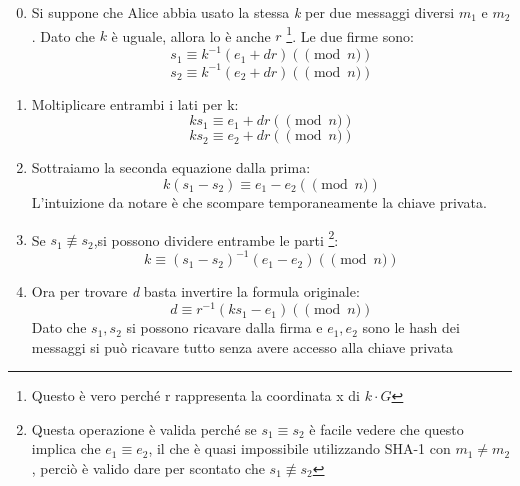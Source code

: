 \documentclass[12pt, a4paper]{report}
\begin{document}
\begin{enumerate}
    \setcounter{enumi}{-1}
    \item Si suppone che Alice abbia usato la stessa \textit{k} per due messaggi diversi $m_1$ e $m_2$. Dato che $k$ è uguale, allora lo è anche $r$ \footnote{Questo è vero perché r rappresenta la coordinata x di $k\cdot G$}. Le due firme sono:
    \begin{equation}
        s_1 \equiv k^{-1}(e_1 + dr) (\pmod n)
    \end{equation}
    \begin{equation}
        s_2 \equiv k^{-1}(e_2 + dr) (\pmod n)
    \end{equation}
    \item Moltiplicare entrambi i lati per k:
    \begin{equation}
        ks_1 \equiv e_1 + dr (\pmod n)
    \end{equation}
    \begin{equation}
        ks_2 \equiv e_2 + dr (\pmod n)
    \end{equation}
    \item Sottraiamo la seconda equazione dalla prima:
    \begin{equation}
        k(s_1 - s_2) \equiv e_1 - e_2 (\pmod n)
    \end{equation}
    L'intuizione da notare è che scompare temporaneamente la chiave privata.
    \item Se $s_1 \not\equiv s_2$,si possono dividere entrambe le parti \footnote{Questa operazione è valida perché se $s_1 \equiv s_2$ è facile vedere che questo implica che $e_1 \equiv e_2$, il che è quasi impossibile utilizzando SHA-1 con $m_1 \neq m_2$, perciò è valido dare per scontato che $s_1 \not\equiv s_2$}:
    \begin{equation}
        k \equiv (s_1 - s_2)^{-1}(e_1 - e_2) (\pmod n)
    \end{equation}
    \item Ora per trovare \textit{d} basta invertire la formula originale:
    \begin{equation}
        d \equiv r^{-1}(ks_1 - e_1) (\pmod n)
    \end{equation}
    Dato che $s_1, s_2$ si possono ricavare dalla firma e $e_1, e_2$ sono le hash dei messaggi si può ricavare tutto senza avere accesso alla chiave privata
\end{enumerate}
\end{document}
